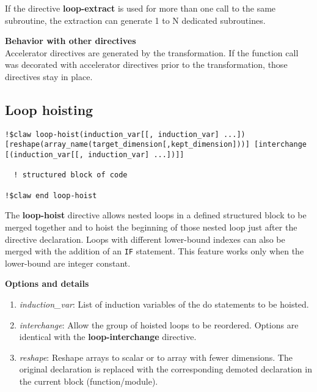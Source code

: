 If the directive \textbf{loop-extract} is used for more than one call to the same
subroutine, the extraction can generate 1 to N dedicated subroutines.

\textbf{Behavior with other directives}\\
Accelerator directives are generated by the transformation. If the function call was decorated 
with accelerator directives prior to the transformation, those directives stay in place. 

\subsection{Loop hoisting}
\begin{lstlisting}
!$claw loop-hoist(induction_var[[, induction_var] ...]) [reshape(array_name(target_dimension[,kept_dimension]))] [interchange [(induction_var[[, induction_var] ...])]]

  ! structured block of code
  
!$claw end loop-hoist
\end{lstlisting}

The \textbf{loop-hoist} directive allows nested loops in a defined structured block to
be merged together and to hoist the beginning of those nested loop just after
the directive declaration. Loops with different lower-bound indexes
can also be merged with the addition of an \lstinline!IF! statement. This feature works 
only when the lower-bound are integer constant. 


\textbf{Options and details}
\begin{enumerate}
\item \textit{induction\_var}: List of induction variables of the do statements to be hoisted. 
\item \textit{interchange}: Allow the group of hoisted loops to be reordered.
Options are identical with the \textbf{loop-interchange} directive.
\item \textit{reshape}: Reshape arrays to scalar or to array with fewer dimensions. The original declaration is replaced with the corresponding demoted declaration in the current block (function/module). 
\end{enumerate}